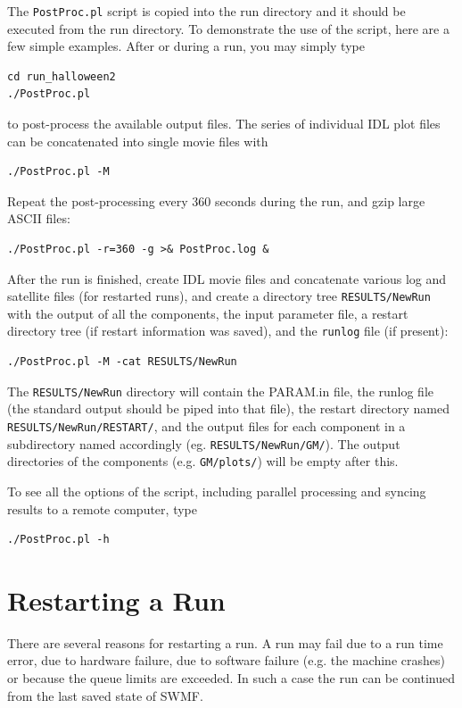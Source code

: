 The {\tt PostProc.pl} script is copied into the run directory and it should
be executed from the run directory.
To demonstrate the use of the script, here are a few simple examples.
After or during a run, you may simply type
\begin{verbatim}
cd run_halloween2
./PostProc.pl
\end{verbatim}
to post-process the available output files. The series of individual 
IDL plot files can be concatenated into single movie files with
\begin{verbatim}
./PostProc.pl -M
\end{verbatim}
Repeat the post-processing every 360 seconds during the run,
and gzip large ASCII files:
\begin{verbatim}
./PostProc.pl -r=360 -g >& PostProc.log &
\end{verbatim}
After the run is finished, create IDL movie files and concatenate
various log and satellite files (for restarted runs),
and create a directory tree {\tt RESULTS/NewRun} with the output
of all the components, the input parameter file, 
a restart directory tree (if restart information was saved), 
and the {\tt runlog} file (if present):
\begin{verbatim}
./PostProc.pl -M -cat RESULTS/NewRun
\end{verbatim}
The {\tt RESULTS/NewRun} directory will contain the PARAM.in file, the
runlog file (the standard output should be piped into that file),
the restart directory named {\tt RESULTS/NewRun/RESTART/},
and the output files for each component in a subdirectory named
accordingly (eg. {\tt RESULTS/NewRun/GM/}). The output directories of
the components (e.g. {\tt GM/plots/}) will be empty after this.

To see all the options of the script, including parallel processing and
syncing results to a remote computer, type
\begin{verbatim}
./PostProc.pl -h
\end{verbatim}

\section{Restarting a Run}

There are several reasons for restarting a run. A run may fail
due to a run time error, due to hardware failure, due to 
software failure (e.g. the machine crashes) or because the
queue limits are exceeded. In such a case the run can be continued from
the last saved state of SWMF. 


